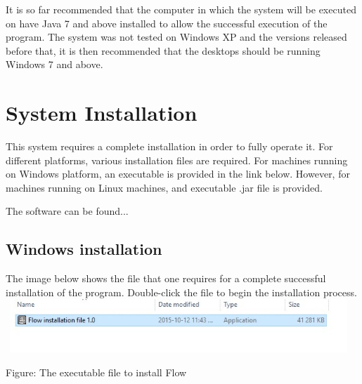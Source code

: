\documentclass[11pt,a4paper,titlepage]{article}
\begin{document}
		It is so far recommended that the computer in which the system will be executed on have Java 7 and above installed to allow the successful execution of the program. The system was not tested on Windows XP and the versions released before that, it is then recommended that the desktops should be running Windows 7 and above.\newline		
		
\section{System Installation}
		
		This system requires a complete installation in order to fully operate it. For different platforms, various installation files are required. \newline \newline
		For machines running on Windows platform, an executable is provided in the link below. However, for machines running on Linux machines, and executable .jar file is provided.\newline
		
				
		The software can be found...
		
		
		
		
		
		
		

		\subsection{Windows installation}
		
		The image below shows the file that one requires for a complete successful installation of the program. Double-click the file to begin the installation process. \newline \newline \newline
		\includegraphics[width=13cm, height=2cm]{images/Install1.jpg}		
		\begin{center}
		Figure: The executable file to install Flow \newline
		\end{center}
			
\end{document}
